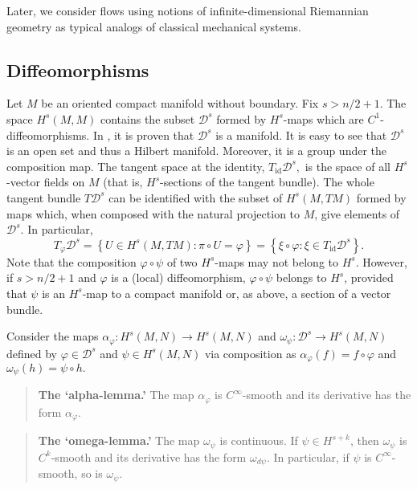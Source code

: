 \documentclass[a5paper,10pt,twoside]{article}
\newcommand{\cD}{\ensuremath{\mathcal{D}}}
\DeclareMathOperator*{\id}{id}
\theoremstyle{plain}
\theoremstyle{definition}
\theoremstyle{remark}
\begin{document}
Later, we consider flows using notions of infinite-dimensional Riemannian
geometry as typical analogs of classical mechanical systems.

\subsection{Diffeomorphisms}
Let $M$ be an oriented compact manifold without boundary. Fix $s > n/2 +1.$ 
The space $H^s(M, M)$ contains the subset $\cD^s$ formed by $H^s$-maps
which are $C^1$-diffeomorphisms. In \cite{ebin1970groups}, it is proven that $\cD^s$ is a manifold. It is easy to see that $\cD^s$ is an open set and thus a Hilbert manifold.
Moreover, it is a group under the composition map. 
The tangent space at the identity, $T_{\id}\cD^s,$ is the space
of all $H^s$-vector fields on $M$ (that is, $H^s$-sections of the tangent bundle). 
The whole tangent bundle $T\cD^s$ can be identified with the subset of $H^s(M, TM)$
formed by
maps which, when composed with the natural projection to $M$, give elements
of $\cD^s$. In particular,
%
\begin{equation}
\label{tangentspace}
T_\varphi\cD^s = \left\{U\in H^s(M,TM): \pi\circ U=\varphi\right\}=\left\{\xi\circ \varphi :\xi\in T_{\id}\cD^s\right\}.
\end{equation}
%
Note that the composition $\varphi\circ\psi$ of two $H^s$-maps may not belong to $H^s$.
However, if $s > n/2 + 1$ and $\varphi$ is a (local) diffeomorphism, $\varphi\circ\psi$ belongs to $H^s$, provided that $\psi$ is an $H^s$-map to a compact manifold or, as above, a section of a vector bundle.

Consider the maps $\alpha_\varphi: H^s(M, N) \to H^s(M, N)$ and $\omega_\psi: \cD^s\to H^s(M, N)$ defined by $\varphi\in\cD^s$ and $\psi\in H^s(M, N)$ via composition as
 $\alpha_\varphi(f) = f\circ \varphi$ and $\omega_\psi (h) = \psi\circ h.$

\begin{quote} 
\textbf{The `alpha-lemma.'} The map $\alpha_\varphi$ is $C^\infty$-smooth and its derivative has the form $\alpha_\varphi$.
\end{quote}

\begin{quote} 
\textbf{The `omega-lemma.'} The map $\omega_\psi$ is continuous. If $\psi\in H^{s+k}$, then $\omega_\psi$ is $C^k$-smooth and its derivative has the form $\omega_{d\psi}$. In particular, if $\psi$ is $C^\infty$-smooth, so is $\omega_\psi$.
\end{quote}
\end{document}

